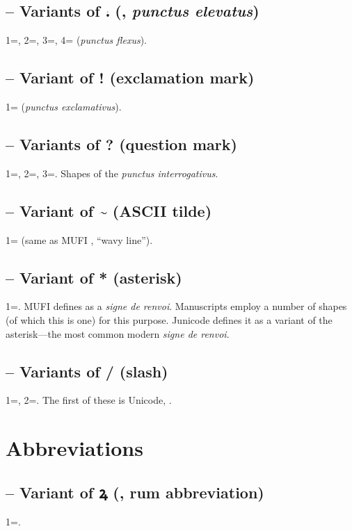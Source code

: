 \subsection{ -- Variants of ⹎ (, \textit{punctus elevatus})}
1=, 2=, 3=, 4= (\textit{punctus flexus}).

\subsection{ -- Variant of ! (exclamation mark)}
1= (\textit{punctus exclamativus}).

\subsection{
-- Variants of ? (question mark)}
1=, 2=, 3=. Shapes of the \textit{punctus interrogativus}.

\subsection{
-- Variant of \~{} (ASCII tilde)}
1= (same as MUFI , ``wavy line'').

\subsection{ --
Variant of * (asterisk)}
1=. MUFI defines  as a \textit{signe de renvoi}. Manuscripts employ a number of shapes (of which this is one) for
this purpose. Junicode defines it as a variant of the asterisk---the most common modern \textit{signe de renvoi}.

\subsection{ -- Variants of / (slash)}
1=, 2=. The first of these is Unicode, .

\section{Abbreviations}
\subsection{ -- Variant of ꝝ (, rum
abbreviation)}
1=.


